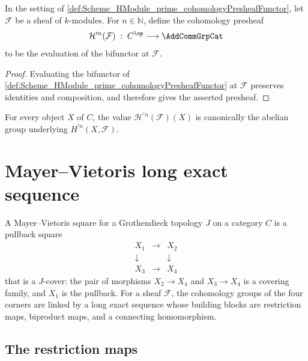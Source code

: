 \begin{definition}\leanok
  \label{def:Scheme_HModule_prime_cohomologyPresheaf}

  In the setting of \cref{def:Scheme_HModule_prime_cohomologyPresheafFunctor}, let \(\mathcal F\) be a sheaf of \(k\)-modules. For \(n \in \mathbb N\), define the cohomology presheaf
  \[
    \mathcal H^{\prime n}(\mathcal F) \;:\; C^{\op} \longrightarrow \AddCommGrpCat
  \]
  to be the evaluation of the bifunctor at \(\mathcal F\).
\end{definition}

\begin{proof}

  \leanok
  Evaluating the bifunctor of \cref{def:Scheme_HModule_prime_cohomologyPresheafFunctor} at \(\mathcal F\) preserves identities and composition, and therefore gives the asserted presheaf.
\end{proof}

\begin{remark}
  For every object \(X\) of \(C\), the value \(\mathcal H^{\prime n}(\mathcal F)(X)\) is canonically the abelian group underlying \(H^{\prime n}(X,\mathcal F)\).
\end{remark}

\section{Mayer--Vietoris long exact sequence}
\label{sec:hmodule_prime_mayer_vietoris}

A Mayer--Vietoris square for a Grothendieck topology \(J\) on a category \(C\) is a pullback square
\[
  \begin{array}{ccc}
    X_1 & \longrightarrow & X_2 \\
    \downarrow & & \downarrow \\
    X_3 & \longrightarrow & X_4
  \end{array}
\]
that is a \(J\)-cover: the pair of morphisms \(X_2 \to X_4\) and \(X_3 \to X_4\) is a covering family, and \(X_1\) is the pullback. For a sheaf \(\mathcal F\), the cohomology groups of the four corners are linked by a long exact sequence whose building blocks are restriction maps, biproduct maps, and a connecting homomorphism.

\subsection{The restriction maps}


